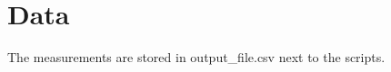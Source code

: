 \documentclass{article}
\begin{document}
\section{Data}
The measurements are stored in output\_file.csv next to the scripts.
\end{document}
